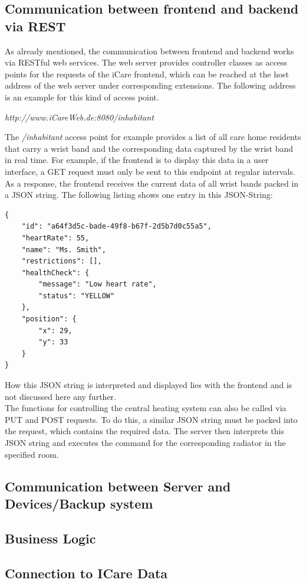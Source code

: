 \subsection{Communication between frontend and backend via REST}
As already mentioned, the communication between frontend and backend works via RESTful web services. The web server provides controller classes as access points for the requests of the iCare frontend, which can be reached at the host address of the web server under corresponding extensions. The following address is an example for this kind of access point.
\begin{center}
	\textit{http://www.iCareWeb.de:8080/inhabitant}
\end{center}
The \textit{/inhabitant} access point for example provides a list of all care home residents that carry a wrist band and the corresponding data captured by the wrist band in real time. For example, if the frontend is to display this data in a user interface, a GET request must only be sent to this endpoint at regular intervals. As a response, the frontend receives the current data of all wrist bands packed in a JSON string. The following listing shows one entry in this JSON-String:
\begin{lstlisting}
{
	"id": "a64f3d5c-bade-49f8-b67f-2d5b7d0c55a5",
	"heartRate": 55,
	"name": "Ms. Smith",
	"restrictions": [],
	"healthCheck": {
		"message": "Low heart rate",
		"status": "YELLOW"
	},
	"position": {
		"x": 29,
		"y": 33
	}
}
\end{lstlisting}
How this JSON string is interpreted and displayed lies with the frontend and is not discussed here any further.
\\
The functions for controlling the central heating system can also be called via PUT and POST requests. To do this, a similar JSON string must be packed into the request, which contains the required data. The server then interprets this JSON string and executes the command for the corresponding radiator in the specified room.

\subsection{Communication between Server and Devices/Backup system}
\subsection{Business Logic}
\subsection{Connection to ICare Data}